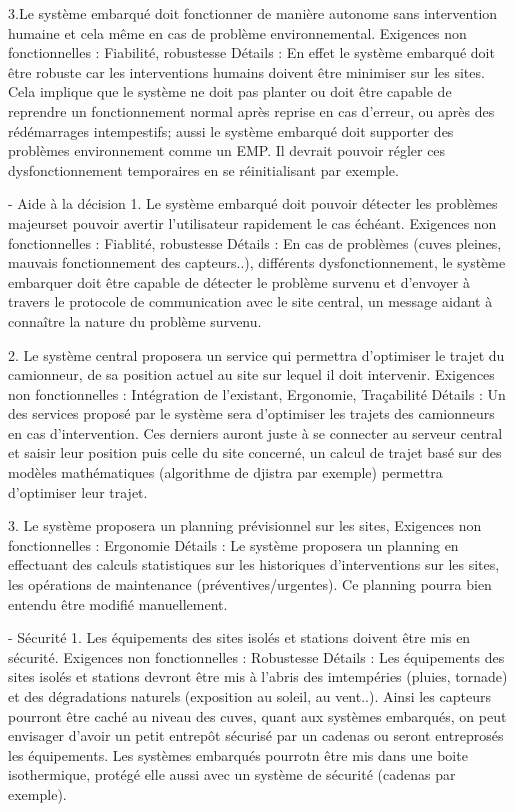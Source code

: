 3.Le système embarqué doit fonctionner de manière autonome sans intervention humaine et cela même en cas de problème
environnemental.
Exigences non fonctionnelles : Fiabilité, robustesse
Détails : En effet le système embarqué doit être robuste car les interventions humains doivent être minimiser sur
les sites. Cela implique que le système ne doit pas planter ou doit être capable de reprendre un fonctionnement normal
après reprise en cas d'erreur, ou après des rédémarrages intempestifs; aussi le système embarqué doit supporter des 
problèmes environnement comme un EMP. Il devrait pouvoir régler ces dysfonctionnement temporaires en se 
réinitialisant par exemple.


- Aide à la décision
1. Le système embarqué doit pouvoir détecter les problèmes majeurset pouvoir avertir l'utilisateur rapidement le cas
échéant.
Exigences non fonctionnelles : Fiablité, robustesse
Détails : En cas de problèmes (cuves pleines, mauvais fonctionnement des capteurs..), différents dysfonctionnement,
le système embarquer doit être capable de détecter le problème survenu et d'envoyer à travers le protocole de
communication avec le site central, un message aidant à connaître la nature du problème survenu.

2. Le système central proposera un service qui permettra d'optimiser le trajet du camionneur, de sa position
actuel au site sur lequel il doit intervenir.
Exigences non fonctionnelles : Intégration de l'existant, Ergonomie, Traçabilité
Détails : Un des services proposé par le système sera d'optimiser les trajets des camionneurs en cas d'intervention.
Ces derniers auront juste à se connecter au serveur central et saisir leur position puis celle du site concerné,
un calcul de trajet basé sur des modèles mathématiques (algorithme de djistra par exemple) permettra d'optimiser 
leur trajet.

3. Le système proposera un planning prévisionnel sur les sites,
Exigences non fonctionnelles : Ergonomie
Détails : Le système proposera un planning en effectuant des calculs statistiques sur les historiques d'interventions sur les sites, 
les opérations de maintenance (préventives/urgentes). Ce planning pourra bien entendu être modifié manuellement.

- Sécurité
1. Les équipements des sites isolés et stations doivent être mis en sécurité.
Exigences non fonctionnelles : Robustesse
Détails : Les équipements des sites isolés et stations devront être mis à l'abris des imtempéries (pluies, tornade) 
et des dégradations naturels (exposition au soleil, au vent..). Ainsi les capteurs pourront être caché au niveau 
des cuves, quant aux systèmes embarqués, on peut envisager d'avoir un petit entrepôt sécurisé par un cadenas ou 
seront entreprosés les équipements. Les systèmes embarqués pourrotn être mis dans une boite isothermique, 
protégé elle aussi avec un système de sécurité (cadenas par exemple).


